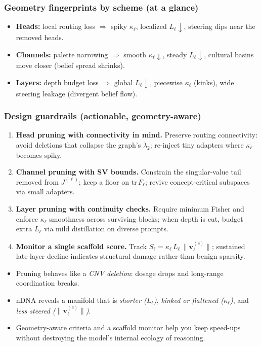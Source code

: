\subsubsection*{Geometry fingerprints by scheme (at a glance)}
\begin{itemize}[leftmargin=1.2em]
\item \textbf{Heads:} local routing loss $\Rightarrow$ spiky $\kappa_\ell$, localized $L_\ell\downarrow$, steering dips near the removed heads.
\item \textbf{Channels:} palette narrowing $\Rightarrow$ smooth $\kappa_\ell\downarrow$, steady $L_\ell\downarrow$, cultural basins move closer (belief spread shrinks).
\item \textbf{Layers:} depth budget loss $\Rightarrow$ global $L_\ell\downarrow$, piecewise $\kappa_\ell$ (kinks), wide steering leakage (divergent belief flow).
\end{itemize}

\subsubsection*{Design guardrails (actionable, geometry-aware)}
\begin{enumerate}[leftmargin=1.2em]
\item \textbf{Head pruning with connectivity in mind.} Preserve routing connectivity: avoid deletions that collapse the graph's $\lambda_2$; re-inject tiny adapters where $\kappa_\ell$ becomes spiky.
\item \textbf{Channel pruning with SV bounds.} Constrain the singular-value tail removed from $J^{(\ell)}$; keep a floor on $\mathrm{tr}\,F_\ell$; revive concept-critical subspaces via small adapters.
\item \textbf{Layer pruning with continuity checks.} Require minimum Fisher and enforce $\kappa_\ell$ smoothness across surviving blocks; when depth is cut, budget extra $L_\ell$ via mild distillation on diverse prompts.
\item \textbf{Monitor a single scaffold score.} Track $S_\ell=\kappa_\ell\,L_\ell\,\|\mathbf v^{(c)}_\ell\|$; sustained late-layer decline indicates structural damage rather than benign sparsity.
\end{enumerate}

\begin{tcolorbox}[colback=black!3,colframe=black!40,title=\textbf{Key takeaways}]
\begin{itemize}[leftmargin=1.2em]
\item Pruning behaves like a \emph{CNV deletion}: dosage drops and long-range coordination breaks.
\item nDNA reveals a manifold that is \emph{shorter (}$L_\ell$\emph{)}, \emph{kinked or flattened (}$\kappa_\ell$\emph{)}, and \emph{less steered (}$\|\mathbf v^{(c)}_\ell\|$\emph{)}.
\item Geometry-aware criteria and a scaffold monitor help you keep speed-ups without destroying the model’s internal ecology of reasoning.
\end{itemize}
\end{tcolorbox}



